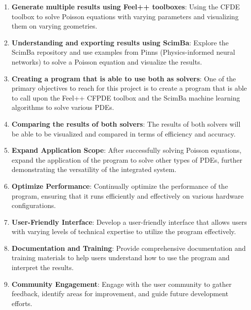 \documentclass[12pt]{article}
\begin{document}
\begin{enumerate}
    \item \textbf{Generate multiple results using Feel++ toolboxes}: Using the CFDE toolbox to solve Poisson equations with varying parameters and visualizing them on varying geometries.
    
    \item \textbf{Understanding and exporting results using ScimBa}: Explore the ScimBa repository and use examples from Pinns (Physics-informed neural networks) to solve a Poisson equation and visualize the results.
    
    \item \textbf{Creating a program that is able to use both as solvers}: One of the primary objectives to reach for this project is to create a program that is able to call upon the Feel++ CFPDE toolbox and the ScimBa machine learning algorithms to solve various PDEs.
    
    \item \textbf{Comparing the results of both solvers}: The results of both solvers will be able to be visualized and compared in terms of efficiency and accuracy.

    \setcounter{enumi}{4}
    \item \textbf{Expand Application Scope}: After successfully solving Poisson equations, expand the application of the program to solve other types of PDEs, further demonstrating the versatility of the integrated system.
    
    \item \textbf{Optimize Performance}: Continually optimize the performance of the program, ensuring that it runs efficiently and effectively on various hardware configurations.
    
    \item \textbf{User-Friendly Interface}: Develop a user-friendly interface that allows users with varying levels of technical expertise to utilize the program effectively.
    
    \item \textbf{Documentation and Training}: Provide comprehensive documentation and training materials to help users understand how to use the program and interpret the results.
    
    \item \textbf{Community Engagement}: Engage with the user community to gather feedback, identify areas for improvement, and guide future development efforts.
\end{enumerate}
\end{document}
